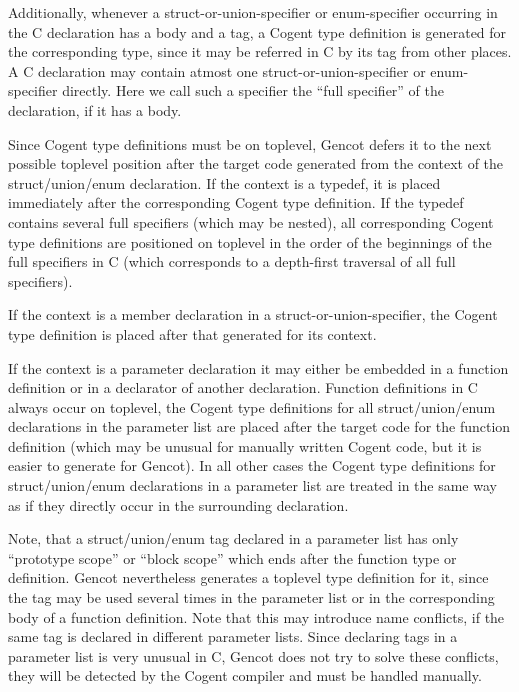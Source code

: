 Additionally, whenever a struct-or-union-specifier or enum-specifier occurring in the C declaration has a body and
a tag, a Cogent type definition is generated for the corresponding type, since it may be referred in C by its tag from
other places. A C declaration may contain atmost one 
struct-or-union-specifier or enum-specifier directly. Here we call such a specifier the ``full specifier'' of 
the declaration, if it has a body. 

Since Cogent type definitions must be on toplevel, Gencot defers it to the next possible toplevel position after the
target code generated from the context of the struct/union/enum declaration. If the context is a typedef, it is placed
immediately after the corresponding Cogent type definition. If the typedef contains several full specifiers (which
may be nested), all corresponding Cogent type definitions are positioned on toplevel in the order of the beginnings
of the full specifiers in C (which corresponds to a depth-first traversal of all full specifiers).

If the context is a member declaration in a struct-or-union-specifier, the Cogent type definition is placed after that
generated for its context. 

If the context is a parameter declaration it may either be embedded in a function definition or in a declarator of another
declaration. Function definitions in C always occur on toplevel, the Cogent type definitions for all struct/union/enum
declarations in the parameter list are placed after the target code for the function definition (which may be unusual for 
manually written Cogent code, but it is easier to generate for Gencot). In all other cases the Cogent type definitions
for struct/union/enum declarations in a parameter list are treated in the same way as if they directly occur in the surrounding
declaration.

Note, that a struct/union/enum tag declared in a parameter list has only ``prototype scope'' or ``block scope'' which
ends after the function type or definition. Gencot nevertheless generates a toplevel type definition for it, since the
tag may be used several times in the parameter list or in the corresponding body of a function definition. Note that 
this may introduce name conflicts, if the same tag is declared in different parameter lists. Since declaring tags in a 
parameter list is very unusual in C, Gencot does not try to solve these conflicts, they will be detected by the Cogent
compiler and must be handled manually.

